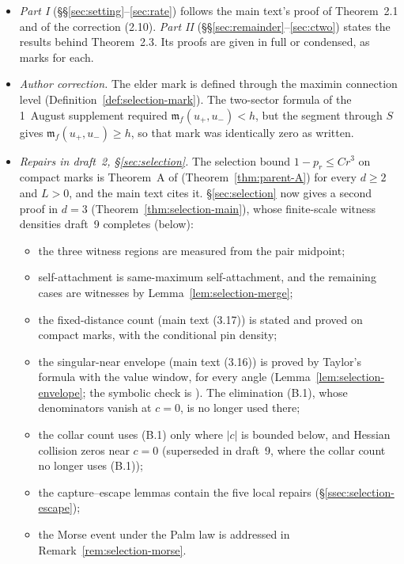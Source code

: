 \begin{itemize}[leftmargin=1.5em,itemsep=2pt]
\begin{itemize}[leftmargin=1.2em,itemsep=1pt]
  \end{itemize}
\item \emph{Part I} (\S\S\ref{sec:setting}--\ref{sec:rate}) follows the main text's proof of Theorem~2.1 and of the correction (2.10). \emph{Part II} (\S\S\ref{sec:remainder}--\ref{sec:ctwo}) states the results behind Theorem~2.3. Its proofs are given in full or condensed, as  marks for each.
\item \emph{Author correction.} The elder mark is defined through the maximin connection level (Definition~\ref{def:selection-mark}). The two-sector formula of the 1~August supplement required $\mathfrak m_f(u_+,u_-)<h$, but the segment through $S$ gives $\mathfrak m_f(u_+,u_-)\ge h$, so that mark was identically zero as written.
\item \emph{Repairs in draft~2, \S\ref{sec:selection}.} The selection bound $1-p_r\le Cr^3$ on compact marks is Theorem~A of \cite{parentP} (Theorem~\ref{thm:parent-A}) for every $d\ge2$ and $L>0$, and the main text cites it. \S\ref{sec:selection} now gives a second proof in $d=3$ (Theorem~\ref{thm:selection-main}), whose finite-scale witness densities draft~9 completes (below):
  \begin{itemize}[leftmargin=1.2em,itemsep=1pt]
  \item the three witness regions are measured from the pair midpoint;
  \item self-attachment is same-maximum self-attachment, and the remaining cases are witnesses by Lemma~\ref{lem:selection-merge};
  \item the fixed-distance count (main text (3.17)) is stated and proved on compact marks, with the conditional pin density;
  \item the singular-near envelope (main text (3.16)) is proved by Taylor's formula with the value window, for every angle (Lemma~\ref{lem:selection-envelope}; the symbolic check is ). The elimination (B.1), whose denominators vanish at $c=0$, is no longer used there;
  \item the collar count uses (B.1) only where $|c|$ is bounded below, and Hessian collision zeros near $c=0$ (superseded in draft~9, where the collar count no longer uses (B.1));
  \item the capture--escape lemmas contain the five local repairs (\S\ref{ssec:selection-escape});
  \item the Morse event under the Palm law is addressed in Remark~\ref{rem:selection-morse}.
  \end{itemize}

\end{itemize}
